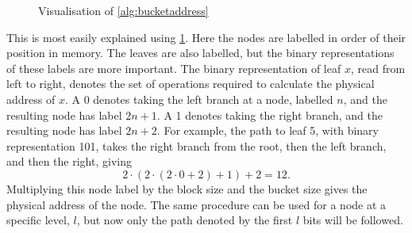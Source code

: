 \documentclass[12pt,a4paper,twoside,openright]{report}
\begin{document}
\begin{figure}[t]
    \centering
  \caption{Visualisation of \cref{alg:bucketaddress}}
  \label{fig:bucketaddress}
\end{figure}

This is most easily explained using \cref{fig:bucketaddress}. Here the nodes are labelled in order of their position in memory. The leaves are also labelled, but the binary representations of these labels are more important. The binary representation of leaf $x$, read from left to right, denotes the set of operations required to calculate the physical address of $x$. A 0 denotes taking the left branch at a node, labelled $n$, and the resulting node has label $2n + 1$. A 1 denotes taking the right branch, and the resulting node has label $2n+2$. For example, the path to leaf 5, with binary representation 101, takes the right branch from the root, then the left branch, and then the right, giving $$2 \cdot (2 \cdot (2 \cdot 0 + 2) + 1) + 2 = 12.$$ Multiplying this node label by the block size and the bucket size gives the physical address of the node. The same procedure can be used for a node at a specific level, $l$, but now only the path denoted by the first $l$ bits will be followed.
\end{document}
